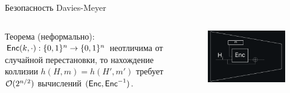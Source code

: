 \documentclass[usenames,dvipsnames,8pt,aspectratio=169]{beamer}
\begin{document}
\begin{frame}{Безопасность Davies-Meyer}

\LARGE
\begin{columns}[T]
\begin{column}{0.6\textwidth}
{\color{Orange} Теорема (неформально):}  $\textsf{Enc}(k, \cdot): \{0,1\}^n \rightarrow \{0,1\}^n$ неотличима от случайной перестановки, то нахождение коллизии $h(H, m) = h(H', m')$ требует $\mathcal{O}(2^{n/2})$ вычислений $(\textsf{Enc}, \textsf{Enc}^{-1})$.
\end{column}
\begin{column}{0.4\textwidth}
\begin{figure}
\includegraphics[width=\textwidth]{DaviesMeyerCompression}
\end{figure}
\end{column}
\end{columns}
\vspace{10pt}	

\end{frame}
\end{document}

